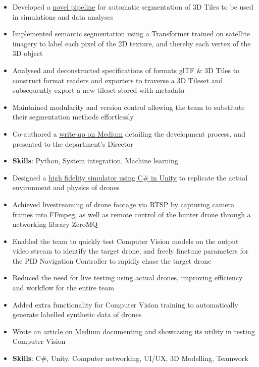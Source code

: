 \documentclass{cv}
\begin{document}
\begin{subsections}
    \subtitle{Simulation \& Training Systems Hub, Defence Science and Technology Agency \hfill Singapore}
    \begin{itemize}
        \item Developed a \href{https://github.com/thedylone/tile-segmentation-pipeline}{novel pipeline} for automatic segmentation of 3D Tiles to be used in simulations and data analyses
        \item Implemented semantic segmentation using a Transformer trained on satellite imagery to label each pixel of the 2D texture, and thereby each vertex of the 3D object
        \item Analysed and deconstructed specifications of formats glTF \& 3D Tiles to construct format readers and exporters to traverse a 3D Tileset and subsequently export a new tileset stored with metadata
        \item Maintained modularity and version control allowing the team to substitute their segmentation methods effortlessly
        \item Co-authored a \href{https://medium.com/d-classified/segmentation-pipeline-for-3d-tiles-1303fcb5e6be}{write-up on Medium} detailing the development process, and presented to the department's Director
        \item \textbf{Skills}: Python, System integration, Machine learning
    \end{itemize}

    \subtitle{Command, Control and Communications Development, Defence Science and Technology Agency \hfill Singapore}
    \begin{itemize}
        \item Designed a \href{https://github.com/thedylone/unity-drone-simulator}{high fidelity simulator using C\# in Unity} to replicate the actual environment and physics of drones
        \item Achieved livestreaming of drone footage via RTSP by capturing camera frames into FFmpeg, as well as remote control of the hunter drone through a networking library ZeroMQ
        \item Enabled the team to quickly test Computer Vision models on the output video stream to identify the target drone, and freely finetune parameters for the PID Navigation Controller to rapidly chase the target drone
        \item Reduced the need for live testing using actual drones, improving efficiency and workflow for the entire team
        \item Added extra functionality for Computer Vision training to automatically generate labelled synthetic data of drones
        \item Wrote an \href{https://medium.com/d-classified/unity-as-a-testbed-for-autonomy-development-1e326323c68d}{article on Medium} documenting and showcasing its utility in testing Computer Vision
        \item \textbf{Skills}: C\#, Unity, Computer networking, UI/UX, 3D Modelling, Teamwork
    \end{itemize}


\end{subsections}
\end{document}
